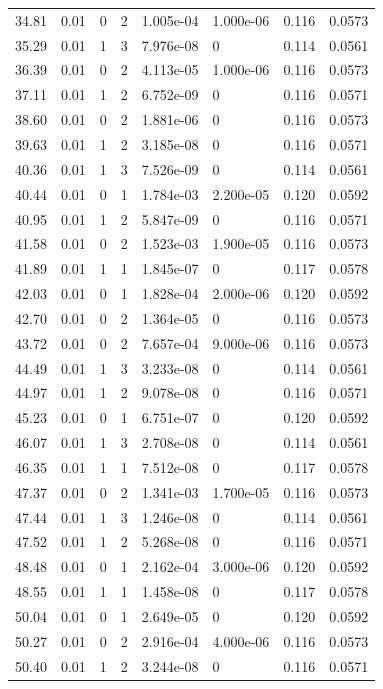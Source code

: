 \documentclass[preview]{standalone}
\begin{document}
{{{\begin{tabular}{L{1.2cm}C{1.2cm} C{0.3cm}C{0.5cm} C{1.4cm}C{1.4cm} C{1.4cm}C{1.4cm}}
  34.81  &  0.01  & 0     &  2 &  1.005e-04  & 1.000e-06  & 0.116 &  0.0573   \\ 
  35.29  &  0.01  & 1     &  3 &  7.976e-08  & 0  & 0.114 &  0.0561   \\ 
  36.39  &  0.01  & 0     &  2 &  4.113e-05  & 1.000e-06  & 0.116 &  0.0573   \\ 
  37.11  &  0.01  & 1     &  2 &  6.752e-09  & 0  & 0.116 &  0.0571   \\ 
  38.60  &  0.01  & 0     &  2 &  1.881e-06  & 0  & 0.116 &  0.0573   \\ 
  39.63  &  0.01  & 1     &  2 &  3.185e-08  & 0  & 0.116 &  0.0571   \\ 
  40.36  &  0.01  & 1     &  3 &  7.526e-09  & 0  & 0.114 &  0.0561   \\ 
  40.44  &  0.01  & 0     &  1 &  1.784e-03  & 2.200e-05  & 0.120 &  0.0592   \\ 
  40.95  &  0.01  & 1     &  2 &  5.847e-09  & 0  & 0.116 &  0.0571   \\ 
  41.58  &  0.01  & 0     &  2 &  1.523e-03  & 1.900e-05  & 0.116 &  0.0573   \\ 
  41.89  &  0.01  & 1     &  1 &  1.845e-07  & 0  & 0.117 &  0.0578   \\ 
  42.03  &  0.01  & 0     &  1 &  1.828e-04  & 2.000e-06  & 0.120 &  0.0592   \\ 
  42.70  &  0.01  & 0     &  2 &  1.364e-05  & 0  & 0.116 &  0.0573   \\ 
  43.72  &  0.01  & 0     &  2 &  7.657e-04  & 9.000e-06  & 0.116 &  0.0573   \\ 
  44.49  &  0.01  & 1     &  3 &  3.233e-08  & 0  & 0.114 &  0.0561   \\ 
  44.97  &  0.01  & 1     &  2 &  9.078e-08  & 0  & 0.116 &  0.0571   \\ 
  45.23  &  0.01  & 0     &  1 &  6.751e-07  & 0  & 0.120 &  0.0592   \\ 
  46.07  &  0.01  & 1     &  3 &  2.708e-08  & 0  & 0.114 &  0.0561   \\ 
  46.35  &  0.01  & 1     &  1 &  7.512e-08  & 0  & 0.117 &  0.0578   \\ 
  47.37  &  0.01  & 0     &  2 &  1.341e-03  & 1.700e-05  & 0.116 &  0.0573   \\ 
  47.44  &  0.01  & 1     &  3 &  1.246e-08  & 0  & 0.114 &  0.0561   \\ 
  47.52  &  0.01  & 1     &  2 &  5.268e-08  & 0  & 0.116 &  0.0571   \\ 
  48.48  &  0.01  & 0     &  1 &  2.162e-04  & 3.000e-06  & 0.120 &  0.0592   \\ 
  48.55  &  0.01  & 1     &  1 &  1.458e-08  & 0  & 0.117 &  0.0578   \\ 
  50.04  &  0.01  & 0     &  1 &  2.649e-05  & 0  & 0.120 &  0.0592   \\ 
  50.27  &  0.01  & 0     &  2 &  2.916e-04  & 4.000e-06  & 0.116 &  0.0573   \\ 
  50.40  &  0.01  & 1     &  2 &  3.244e-08  & 0  & 0.116 &  0.0571   \\ 
\hline 
\end{tabular} 

}}}
\end{document}
